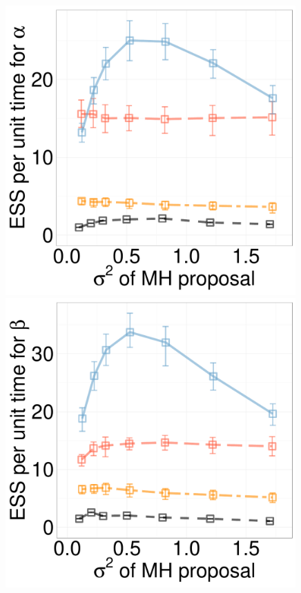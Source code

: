   \begin{figure}[H]
  \centering
  \begin{minipage}[!hp]{0.24\linewidth}

  \centering
    \includegraphics [width=0.99\textwidth, angle=0]{figs/new_experiment_figs/exp_alpha_dim3_k2.pdf}
\end{minipage}
  \begin{minipage}[hp]{0.24\linewidth}
  \centering
    \includegraphics [width=0.99\textwidth, angle=0]{figs/new_experiment_figs/exp_beta_dim3_k2.pdf}

\end{minipage}
\end{figure}
